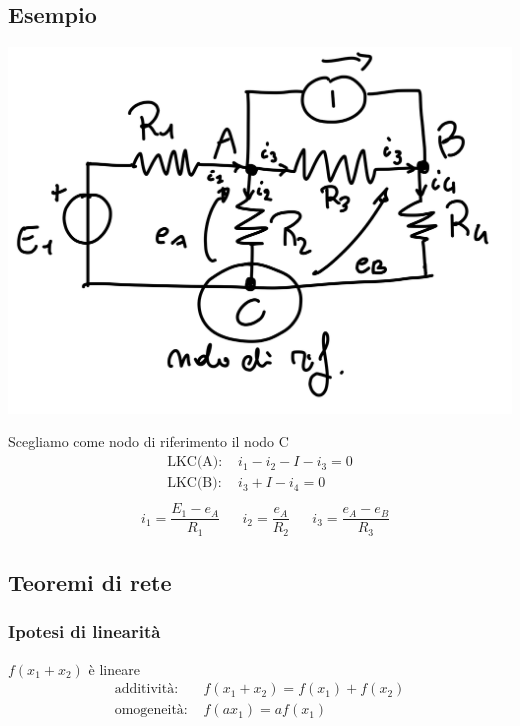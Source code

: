 \documentclass{article}
\begin{document}
\subsection{Esempio}
\begin{center}
    \includegraphics[scale=0.12]{Image/Esempio_PotenzialiNodo.png}
\end{center}
Scegliamo come nodo di riferimento il nodo C
\begin{align*}
    \text{LKC(A): }&i_1-i_2 - I - i_3=0\\
    \text{LKC(B): }&i_3 + I - i_4=0\\
\end{align*}
\begin{align*}
    &i_1=\dfrac{E_1-e_A}{R_1} & &i_2 = \dfrac{e_A}{R_2} & &i_3 = \dfrac{e_A-e_B}{R_3}
\end{align*}







\subsection{Teoremi di rete}
\subsubsection*{Ipotesi di linearità}
 $f(x_1+x_2)$ è lineare
\begin{align*}
    \text{additività: } &f(x_1+x_2) = f(x_1) + f(x_2)\\
    \text{omogeneità: } &f(ax_1) = af(x_1)
\end{align*}
\end{document}
